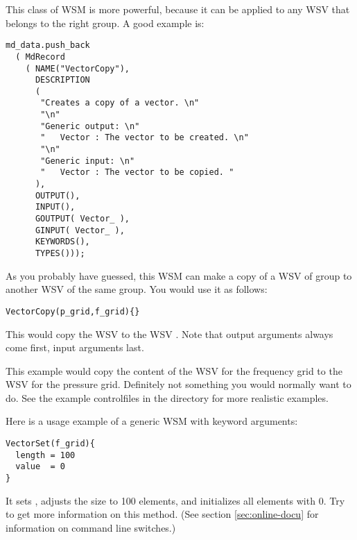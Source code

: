 This class of WSM is more powerful, because it can be applied to any
WSV that belongs to the right group. A good example is:

{\small
\begin{verbatim}
md_data.push_back
  ( MdRecord
    ( NAME("VectorCopy"),
      DESCRIPTION
      (
       "Creates a copy of a vector. \n"
       "\n"
       "Generic output: \n"
       "   Vector : The vector to be created. \n"
       "\n"
       "Generic input: \n"
       "   Vector : The vector to be copied. "
      ),
      OUTPUT(),
      INPUT(),
      GOUTPUT( Vector_ ),
      GINPUT( Vector_ ),
      KEYWORDS(),
      TYPES()));
\end{verbatim}
}

\noindent
As you probably have guessed, this WSM can make a copy of a WSV of
group  to another WSV of the same group. You would
use it as follows: 

{\small
\begin{verbatim}
VectorCopy(p_grid,f_grid){} 
\end{verbatim}
}

\noindent
This would copy the WSV  to the WSV
.  Note that output arguments always come first,
input arguments last.

This example would copy the content of the WSV for the frequency grid
to the WSV for the pressure grid. Definitely not something you would
normally want to do. See the example controlfiles in the
 directory for more realistic examples. 

Here is a usage example of a generic WSM with keyword arguments:

{\small
\begin{verbatim}
VectorSet(f_grid){
  length = 100
  value  = 0
}
\end{verbatim}
}

\noindent
It sets , adjusts the size to 100 elements, and
initializes all elements with 0. Try  to
get more information on this method. (See section
\ref{sec:online-docu} for information on command line switches.)



\label{sec:agendas:agendas}


\label{sec:online-docu}



